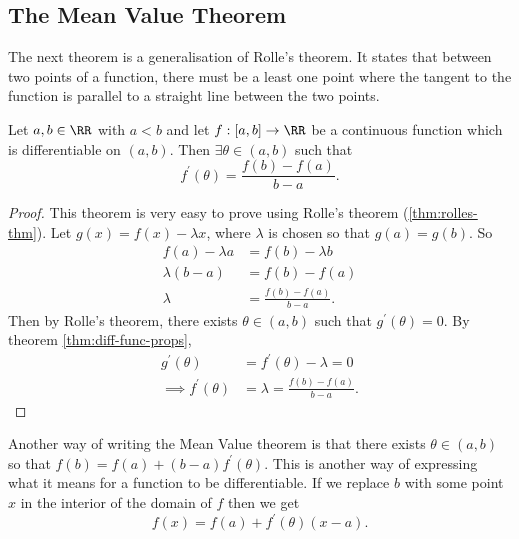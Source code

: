 \documentclass[../real_analysis.tex]{subfiles}
\begin{document}
        \subsection{The Mean Value Theorem}\label{subsec:mean-value-theorem}
            The next theorem is a generalisation of Rolle's theorem. It states that between two points of a function, there must be a least one point where the tangent to the function is parallel to a straight line between the two points.
            \begin{theorem}\label{thm:mvt}
                Let $a,b\in\RR$ with $a<b$ and let $f:[a,b]\to\RR$ be a continuous function which is differentiable on $(a,b)$. Then $\exists\theta\in(a,b)$ such that
                \begin{equation}
                    f^\prime(\theta)=\frac{f(b)-f(a)}{b-a}.
                \end{equation}
            \end{theorem}
            \begin{proof}
                This theorem is very easy to prove using Rolle's theorem (\ref{thm:rolles-thm}). Let $g(x)=f(x)-\lambda x$, where $\lambda$ is chosen so that $g(a)=g(b)$. So
                \begin{align}
                    f(a)-\lambda a&=f(b)-\lambda b\\
                    \lambda(b-a)&=f(b)-f(a)\\
                    \lambda&=\frac{f(b)-f(a)}{b-a}.
                \end{align}
                Then by Rolle's theorem, there exists $\theta\in(a,b)$ such that $g^\prime(\theta)=0$. By theorem \ref{thm:diff-func-props},
                \begin{align}
                    g^\prime(\theta)&=f^\prime(\theta)-\lambda=0\\
                    \implies f^\prime(\theta)&=\lambda=\frac{f(b)-f(a)}{b-a}.
                \end{align}
            \end{proof}
            Another way of writing the Mean Value theorem is that there exists $\theta\in(a,b)$ so that $f(b)=f(a)+(b-a)f^\prime(\theta)$. This is another way of expressing what it means for a function to be differentiable. If we replace $b$ with some point $x$ in the interior of the domain of $f$ then we get
            \begin{equation}
                f(x)=f(a)+f^\prime(\theta)(x-a).
            \end{equation}
\end{document}
